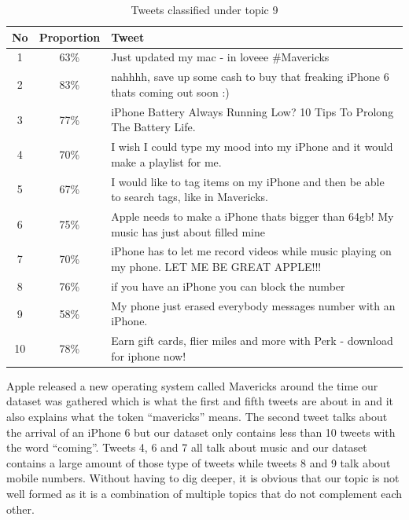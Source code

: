 \begin{table}[H]
  \begin{tabular}{c c p{13cm}} \toprule
    No & Proportion & Tweet \\ \midrule
    1  & 63\%       & Just updated my mac - in loveee \#Mavericks \\ \midrule
    2  & 83\%       & nahhhh, save up some cash to buy that freaking iPhone 6 thats coming out soon :) \\ \midrule
    3  & 77\%       & iPhone Battery Always Running Low? 10 Tips To Prolong The Battery Life. \\ \midrule
    4  & 70\%       & I wish I could type my mood into my iPhone and it would make a playlist for me. \\ \midrule
    5  & 67\%       & I would like to tag items on my iPhone and then be able to search tags, like in Mavericks. \\ \midrule
    6  & 75\%       & Apple needs to make a iPhone thats bigger than 64gb! My music has just about filled mine \\ \midrule
    7  & 70\%       & iPhone has to let me record videos while music playing on my phone. LET ME BE GREAT APPLE!!! \\ \midrule
    8  & 76\%       & if you have an iPhone you can block the number \\ \midrule
    9  & 58\%       & My phone just erased everybody messages number with an iPhone. \\ \midrule
    10 & 78\%       & Earn gift cards, flier miles and more with Perk - download for iphone now! \\ \bottomrule
  \end{tabular}
  \caption{Tweets classified under topic 9}
  \label{tab:topic-9-tweets}
\end{table}

Apple released a new operating system called Mavericks around the time our dataset was gathered
which is what the first and fifth tweets are about in  and it also
explains what the token ``mavericks'' means. The second tweet talks about the arrival of an iPhone 6
but our dataset only contains less than 10 tweets with the word ``coming''. Tweets 4, 6 and 7 all
talk about music and our dataset contains a large amount of those type of tweets while tweets 8 and
9 talk about mobile numbers. Without having to dig deeper, it is obvious that our topic is not well
formed as it is a combination of multiple topics that do not complement each other.

